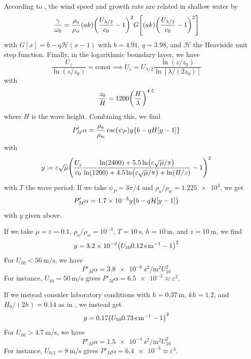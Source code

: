 \documentclass{jfm}
\renewcommand*{\epsilon}{\varepsilon}
\begin{document}
According to \citet{donelan2006wave}, the wind speed and growth rate
are related in shallow water by
\[
  \frac{\gamma}{\omega_0} = \frac{\rho_a}{\rho_w} (ak)
  \pqty{\frac{U_{\lambda/2}}{c_0} - 1}^2
  G \bqty{(ak)
  \pqty{\frac{U_{\lambda/2}}{c_0} - 1}^2}
\]
with $G[x] = b - q \mathcal{H}(x - 1)$ with $b = 4.91$, $q = 3.98$, and
$\mathcal{H}$ the Heaviside unit step function.
Finally, in the logarithmic boundary layer, we have
\[
  \frac{U_z}{\ln(z/z_0)} = \text{const}
  \implies U_{z} = U_{\lambda/2} \frac{\ln(z/z_0)}{\ln[\lambda/(2 z_0)]}
\]
with \citep{taylor2001dependence}
\[
  \frac{z_0}{H} = 1200 \pqty{\frac{H}{\lambda}}^{4.5}
\]
where $H$ is the wave height.
Combining this, we find
\[
  P'_M \alpha = \frac{\rho_a}{\rho_w} \csc(\psi_P)
  y \Bqty{b-qH[y - 1]}
\]
with
\[
  y \coloneqq
  \epsilon \sqrt{\mu}
  \pqty{\frac{U_{z}}{c_0} \frac{\ln(2400)+5.5\ln(\epsilon \sqrt{\mu}/\pi)}
    {\ln(1200) + 4.5 \ln(\epsilon \sqrt{\mu}/\pi) + \ln(H/z)} - 1}^2
\]
with $T$ the wave period.
If we take $\psi_P = 3\pi/4$ and $\rho_a/\rho_w = \num{1.225e3}$, we get
\[
  P'_M \alpha = \num{1.7e-3} y \Bqty{b-q \mathcal{H}[y - 1]}
\]
with $y$ given above.

If we take $\mu = \epsilon = 0.1$, $\rho_a/\rho_w = 10^{-3}$, $T =
\SI{10}{\second}$, $h = \SI{10}{\meter}$, and $z = \SI{10}{\meter}$, we
find
\[
  y = \num{3.2e-2} \pqty{U_{10} \SI{0.12}{\second\per\meter} - 1}^2
\]
For $U_{10} < \SI{56}{\meter\per\second}$, we have
\[
  P'_M \alpha = \SI{3.8e-6}{\second\squared\per\meter\squared} U_{10}^2
\]
For instance, $U_{10} = \SI{50}{\meter\per\second}$ gives
$P'_M \alpha = \num{6.5e-3} \approx \epsilon^2$.

If we instead consider laboratory conditions with $h=\SI{0.37}{\meter}$,
$kh = 1.2$, and $H_0/(2h) = 0.14$ as in \citet{feddersen2005wind}, we
instead get
\[
  y = \num{0.17} \pqty{U_{10} \SI{0.73}{\second\per\meter} - 1}^2
\]
For $U_{10} > \SI{4.7}{\meter\per\second}$, we have
\[
  P'_M \alpha = \SI{1.5e-4}{\second\squared\per\meter\squared} U_{10}^2
\]
For instance, $U_{0.3} = \SI{8}{\meter\per\second}$ gives
$P'_M \alpha = \num{6.4e-3} \approx \epsilon^3$.
\end{document}
